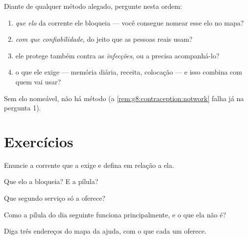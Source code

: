 \begin{method}\label{met:g8:contraception:evaluate}
Diante de qualquer método alegado, pergunte nesta ordem:
\begin{enumerate}
  \item \emph{que elo} da corrente ele bloqueia --- você consegue
        nomear esse elo no mapa?
  \item \emph{com que confiabilidade}, do jeito que as pessoas reais
        usam?
  \item ele protege também contra as \emph{infecções}, ou a 
        precisa acompanhá-lo?
  \item o que ele exige --- memória diária, receita, colocação --- e
        isso combina com quem vai usar?
\end{enumerate}
Sem elo nomeável, não há método (a
\cref{rem:g8:contraception:notwork} falha já na pergunta 1).
\end{method}

\section{Exercícios}

\begin{exercise}[$\star$]\label{exo:g8:contraception:1}
Enuncie a corrente que a  exige e defina  em
relação a ela.
\end{exercise}

\begin{exercise}[$\star$]\label{exo:g8:contraception:2}
Que elo a  bloqueia? E a pílula?
\end{exercise}

\begin{exercise}[$\star$]\label{exo:g8:contraception:3}
Que segundo serviço só a  oferece?
\end{exercise}

\begin{exercise}[$\star$]\label{exo:g8:contraception:4}
Como a pílula do dia seguinte funciona principalmente, e o que ela não
é?
\end{exercise}

\begin{exercise}[$\star$]\label{exo:g8:contraception:5}
Diga três endereços do mapa da ajuda, com o que cada um oferece.
\end{exercise}


